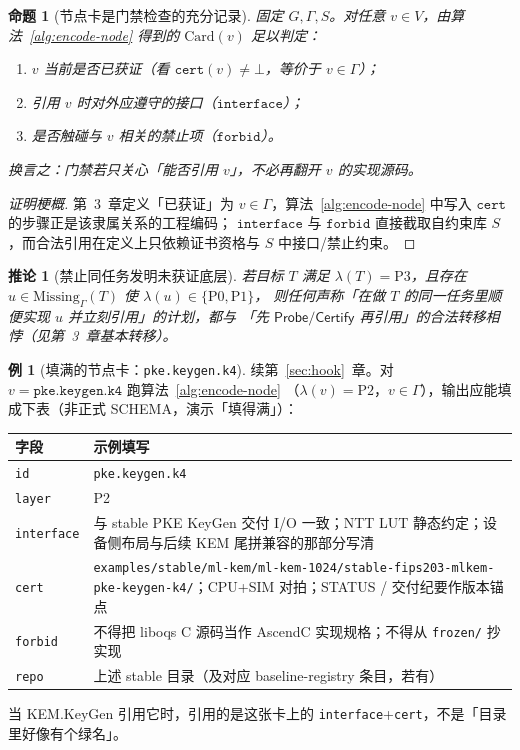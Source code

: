 \documentclass[UTF8,a4paper,11pt]{ctexart}
\theoremstyle{definition}
\newtheorem{example}{例}[section]
\theoremstyle{plain}
\newtheorem{proposition}{命题}[section]
\newtheorem{corollary}{推论}[section]
\theoremstyle{remark}
\numberwithin{figure}{section}
\numberwithin{table}{section}
\begin{document}
\begin{proposition}[节点卡是门禁检查的充分记录]
\label{prop:card-sufficient}
固定 $G,\Gamma,S$。对任意 $v\in V$，由算法~\ref{alg:encode-node} 得到的 $\mathrm{Card}(v)$ 足以判定：
\begin{enumerate}
  \item $v$ 当前是否已获证（看 $\texttt{cert}(v)\neq\bot$，等价于 $v\in\Gamma$）；
  \item 引用 $v$ 时对外应遵守的接口（$\texttt{interface}$）；
  \item 是否触碰与 $v$ 相关的禁止项（$\texttt{forbid}$）。
\end{enumerate}
换言之：门禁若只关心「能否引用 $v$」，不必再翻开 $v$ 的实现源码。
\end{proposition}
\begin{proof}[证明梗概]
第~3~章定义「已获证」为 $v\in\Gamma$，算法~\ref{alg:encode-node} 中写入 $\texttt{cert}$ 的步骤正是该隶属关系的工程编码；
$\texttt{interface}$ 与 $\texttt{forbid}$ 直接截取自约束库 $S$，而合法引用在定义上只依赖证书资格与 $S$ 中接口/禁止约束。
\end{proof}

\begin{corollary}[禁止同任务发明未获证底层]
若目标 $T$ 满足 $\lambda(T)=\mathrm{P3}$，且存在 $u\in\mathrm{Missing}_\Gamma(T)$ 使 $\lambda(u)\in\{\mathrm{P0},\mathrm{P1}\}$，
则任何声称「在做 $T$ 的同一任务里顺便实现 $u$ 并立刻引用」的计划，都与
「先 $\mathsf{Probe}/\mathsf{Certify}$ 再引用」的合法转移相悖（见第~3~章基本转移）。
\end{corollary}

\begin{example}[填满的节点卡：\texttt{pke.keygen.k4}]
续第~\ref{sec:hook}~章。对 $v=\texttt{pke.keygen.k4}$ 跑算法~\ref{alg:encode-node}
（$\lambda(v)=\mathrm{P2}$，$v\in\Gamma$），输出应能填成下表（非正式 SCHEMA，演示「填得满」）：
\begin{center}
\begin{tabular}{@{}L{2.2cm}L{11.6cm}@{}}
  \toprule
  字段 & 示例填写 \\
  \midrule
  \texttt{id} & \texttt{pke.keygen.k4} \\
  \texttt{layer} & P2 \\
  \texttt{interface} &
  与 stable PKE KeyGen 交付 I/O 一致；NTT LUT 静态约定；设备侧布局与后续 KEM 尾拼兼容的那部分写清 \\
  \texttt{cert} &
  \texttt{examples/stable/ml-kem/ml-kem-1024/stable-fips203-mlkem-pke-keygen-k4/}；CPU+SIM 对拍；STATUS / 交付纪要作版本锚点 \\
  \texttt{forbid} &
  不得把 liboqs C 源码当作 AscendC 实现规格；不得从 \texttt{frozen/} 抄实现 \\
  \texttt{repo} & 上述 stable 目录（及对应 baseline-registry 条目，若有） \\
  \bottomrule
\end{tabular}
\end{center}
当 KEM.KeyGen 引用它时，引用的是这张卡上的 \texttt{interface}+\texttt{cert}，不是「目录里好像有个绿名」。
\end{example}
\end{document}
